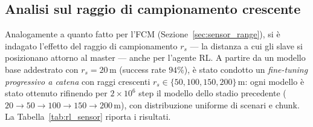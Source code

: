 \subsection{Analisi sul raggio di campionamento crescente}
\label{sec:rl_sensor}

Analogamente a quanto fatto per l'FCM (Sezione~\ref{sec:sensor_range}), si \`e indagato
l'effetto del raggio di campionamento $r_s$ --- la distanza a cui gli slave si
posizionano attorno al master --- anche per l'agente RL. A partire da un modello base
addestrato con $r_s = 20\,\text{m}$ (success rate $94\%$), \`e stato condotto un
\emph{fine-tuning progressivo a catena} con raggi crescenti
$r_s \in \{50, 100, 150, 200\}\,\text{m}$: ogni modello \`e stato ottenuto rifinendo per
$2 \times 10^6$ step il modello dello stadio precedente
($20 \to 50 \to 100 \to 150 \to 200\,\text{m}$), con distribuzione uniforme di scenari e
chunk. La Tabella~\ref{tab:rl_sensor} riporta i risultati.

\begin{table}[H]
\centering
\renewcommand{\arraystretch}{1.3}
\caption{Sweep sul raggio di campionamento per l'agente RL (fine-tuning progressivo dal
         modello base a $20\,\text{m}$, 1560 episodi per valore). In verde il valore
         ottimale.}
\label{tab:rl_sensor}
\end{table}

